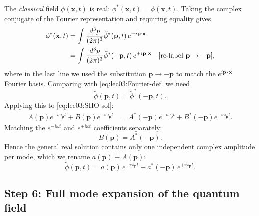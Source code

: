 The \emph{classical} field $\phi(\mathbf{x},t)$ is real:
$\phi^*(\mathbf{x},t)=\phi(\mathbf{x},t)$.  Taking the complex
conjugate of the Fourier representation and requiring equality gives
\begin{align}
  \phi^*(\mathbf{x},t)
  &= \int \frac{d^3p}{(2\pi)^3}
        \tilde\phi^*(\mathbf{p},t)\,e^{-i\mathbf{p}\cdot\mathbf{x}}
  \notag\\
  &= \int \frac{d^3p}{(2\pi)^3}
        \tilde\phi^*(-\mathbf{p},t)\,e^{+i\mathbf{p}\cdot\mathbf{x}}
        \quad [\text{re-label }\mathbf{p}\to -\mathbf{p}],
  \label{eq:lec03:reality-step}
\end{align}
where in the last line we used the substitution $\mathbf{p}\to-\mathbf{p}$
to match the $e^{i\mathbf{p}\cdot\mathbf{x}}$ Fourier basis.
Comparing with \eqref{eq:lec03:Fourier-def} we need
\begin{equation}
  \tilde\phi(\mathbf{p},t) = \tilde\phi^*(-\mathbf{p},t).
  \label{eq:lec03:reality-cond}
\end{equation}
Applying this to \eqref{eq:lec03:SHO-sol}:
\begin{align}
  A(\mathbf{p})e^{-i\omega_{\mathbf{p}} t}
  + B(\mathbf{p})e^{+i\omega_{\mathbf{p}} t}
  &= A^*(-\mathbf{p})e^{+i\omega_{\mathbf{p}} t}
   + B^*(-\mathbf{p})e^{-i\omega_{\mathbf{p}} t}.
  \label{eq:lec03:reality-match}
\end{align}
Matching the $e^{-i\omega t}$ and $e^{+i\omega t}$ coefficients
separately:
\begin{equation}
  B(\mathbf{p}) = A^*(-\mathbf{p}).
  \label{eq:lec03:B-from-A}
\end{equation}
Hence the general real solution contains only one independent
complex amplitude per mode, which we rename $a(\mathbf{p})\equiv A(\mathbf{p})$:
\begin{equation}
  \tilde\phi(\mathbf{p},t)
  = a(\mathbf{p})\,e^{-i\omega_{\mathbf{p}} t}
    + a^*(-\mathbf{p})\,e^{+i\omega_{\mathbf{p}} t}.
  \label{eq:lec03:phi-tilde}
\end{equation}

\subsection*{Step 6: Full mode expansion of the quantum field}


